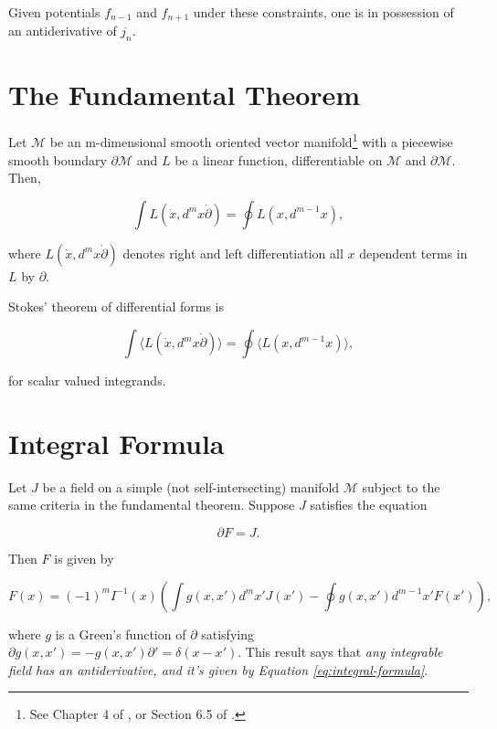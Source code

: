 \documentclass{article}
\begin{document}
Given potentials $f_{n-1}$ and $f_{n+1}$ under these constraints, one is in possession of an antiderivative of $j_n$.

\section{The Fundamental Theorem}

Let $\mathcal{M}$ be an m-dimensional smooth oriented vector manifold\footnote{See Chapter 4 of \cite{cagc}, or Section 6.5 of \cite{gap}.} with a piecewise smooth boundary $\partial \mathcal{M}$ and $L$ be a linear function, differentiable on $\mathcal{M}$ and $\partial \mathcal{M}$. Then, \cite{cagc} \cite{sobczyk} \cite{gap}

\begin{equation}
  \int L(\dot x, d^mx \dot \partial) = \oint L(x, d^{m-1}x),\label{eq:fundamental-theorem}
\end{equation}

where $L(\dot x, d^mx \dot \partial)$ denotes right and left differentiation all $x$ dependent terms in $L$ by $\partial$.

Stokes' theorem of differential forms is

\begin{equation}
  \int \langle L(\dot x, d^mx \dot \partial)\rangle = \oint \langle L(x, d^{m-1}x)\rangle,
\end{equation}

for scalar valued integrands.

\section{Integral Formula}

Let $J$ be a field on a simple (not self-intersecting) manifold $\mathcal{M}$ subject to the same criteria in the fundamental theorem. Suppose $J$ satisfies the equation

\begin{equation}
  \partial F = J.
\end{equation}

Then $F$ is given by \cite{cagc}

\begin{equation}
  F(x) = (-1)^m I^{-1}(x) \left(\int g(x, x') d^{m}x' J(x') - \oint g(x, x') d^{m-1}x' F(x')\right),\label{eq:integral-formula}
\end{equation}

where $g$ is a Green's function of $\partial$ satisfying $\partial g(x,x') = - g(x, x') \partial' = \delta(x - x').$ This result says that \emph{any integrable field has an antiderivative, and it's given by Equation \ref{eq:integral-formula}}.
\end{document}

